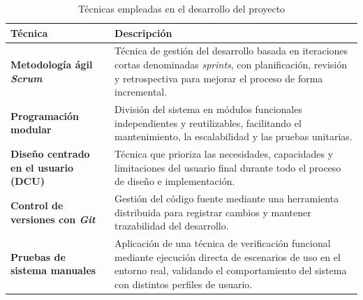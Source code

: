\begin{table}[p]
    \centering
    \caption{Técnicas empleadas en el desarrollo del proyecto}
    \label{tab:tecnicas}
    \begin{tabular}{|p{4.5cm}|p{9.5cm}|}
        \hline
        \textbf{Técnica} & \textbf{Descripción} \\
        \hline
        \textbf{Metodología ágil \textit{Scrum}} & Técnica de gestión del desarrollo basada en iteraciones cortas denominadas \textit{sprints}, con planificación, revisión y retrospectiva para mejorar el proceso de forma incremental. \\
        \hline
        \textbf{Programación modular} & División del sistema en módulos funcionales independientes y reutilizables, facilitando el mantenimiento, la escalabilidad y las pruebas unitarias. \\
        \hline
        \textbf{Diseño centrado en el usuario (DCU)} & Técnica que prioriza las necesidades, capacidades y limitaciones del usuario final durante todo el proceso de diseño e implementación. \\
        \hline
        \textbf{Control de versiones con \textit{Git}} & Gestión del código fuente mediante una herramienta distribuida para registrar cambios y mantener trazabilidad del desarrollo. \\
        \hline
        \textbf{Pruebas de sistema manuales} & Aplicación de una técnica de verificación funcional mediante ejecución directa de escenarios de uso en el entorno real, validando el comportamiento del sistema con distintos perfiles de usuario. \\
        \hline
    \end{tabular}
\end{table}